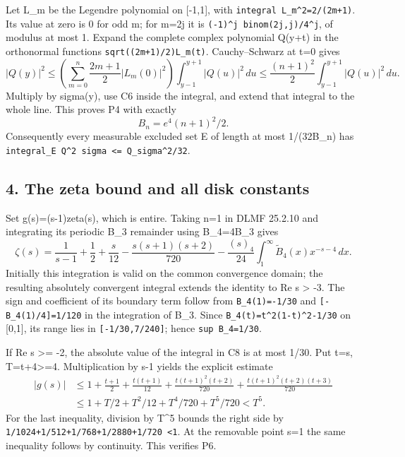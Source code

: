 \documentclass[11pt]{article}
\begin{document}
Let L\_m be the Legendre polynomial on {[}-1,1{]}, with \texttt{integral\ L\_m\^{}2=2/(2m+1)}. Its value at zero is 0 for odd m; for m=2j it is \texttt{(-1)\^{}j\ binom(2j,j)/4\^{}j}, of modulus at most 1. Expand the complete complex polynomial Q(y+t) in the orthonormal functions \texttt{sqrt((2m+1)/2)L\_m(t)}. Cauchy--Schwarz at t=0 gives \[
|Q(y)|^2\le
 \left(\sum_{m=0}^n\frac{2m+1}{2}|L_m(0)|^2\right)
 \int_{y-1}^{y+1}|Q(u)|^2\,du
\le\frac{(n+1)^2}{2}\int_{y-1}^{y+1}|Q(u)|^2\,du.
\] Multiply by sigma(y), use C6 inside the integral, and extend that integral to the whole line. This proves P4 with exactly \[
B_n=e^4(n+1)^2/2.
\tag{C7}
\] Consequently every measurable excluded set E of length at most 1/(32B\_n) has \texttt{integral\_E\ \textbar{}Q\textbar{}\^{}2\ sigma\ \textless{}=\ \textbar{}\textbar{}Q\textbar{}\textbar{}\_sigma\^{}2/32}.

\subsection{4. The zeta bound and all disk constants}\label{mrcoerc:the-zeta-bound-and-all-disk-constants}

Set g(s)=(s-1)zeta(s), which is entire. Taking n=1 in DLMF 25.2.10 and integrating its periodic B\_3 remainder using B\_4\textquotesingle=4B\_3 gives \[
\zeta(s)=\frac1{s-1}+\frac12+\frac{s}{12}
 -\frac{s(s+1)(s+2)}{720}
 -\frac{(s)_4}{24}\int_1^\infty\widetilde B_4(x)x^{-s-4}\,dx.
\tag{C8}
\] Initially this integration is valid on the common convergence domain; the resulting absolutely convergent integral extends the identity to Re s \textgreater{} -3. The sign and coefficient of its boundary term follow from \texttt{B\_4(1)=-1/30} and \texttt{{[}-B\_4(1)/4{]}=1/120} in the integration of B\_3. Since \texttt{B\_4(t)=t\^{}2(1-t)\^{}2-1/30} on {[}0,1{]}, its range lies in \texttt{{[}-1/30,7/240{]}}; hence \texttt{sup\ \textbar{}B\_4\textbar{}=1/30}.

If Re s \textgreater= -2, the absolute value of the integral in C8 is at most 1/30. Put t=\textbar s\textbar, T=t+4\textgreater=4. Multiplication by s-1 yields the explicit estimate \[
\begin{aligned}
|g(s)|&\le1+\frac{t+1}{2}+\frac{t(t+1)}{12}
 +\frac{t(t+1)^2(t+2)}{720}
 +\frac{t(t+1)^2(t+2)(t+3)}{720}
\\
&\le1+T/2+T^2/12+T^4/720+T^5/720<T^5.
\end{aligned}
\tag{C9}
\] For the last inequality, division by T\^{}5 bounds the right side by \texttt{1/1024+1/512+1/768+1/2880+1/720\ \textless{}1}. At the removable point s=1 the same inequality follows by continuity. This verifies P6.
\end{document}
